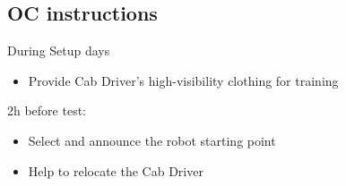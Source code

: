 \subsection{OC instructions}
During Setup days
\begin{itemize}
	\item Provide Cab Driver's high-visibility clothing for training
\end{itemize}

2h before test:
\begin{itemize}
	\item Select and announce the robot starting point
	\item Help to relocate the Cab Driver
\end{itemize}

% 
